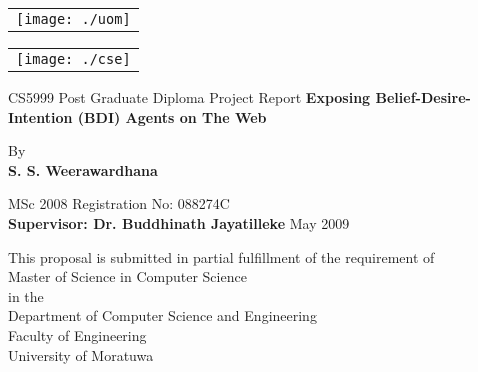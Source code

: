 \begin{titlepage}

\begin{minipage}{1in}
\begin{tabular}{l}
\texttt{[image: ./uom]}
\end{tabular}
\end{minipage}
\hfill
\begin{minipage}{1in}
\begin{tabular}{r}
\texttt{[image: ./cse]}
\end{tabular}
\end{minipage}


\begin{center}

\textmd{CS5999 Post Graduate Diploma Project Report}
\vfill
{ \huge \textbf{Exposing Belief-Desire-Intention (BDI) Agents on The Web} }\\[0.4cm]
\begin{center}
\vfill
By\\
\vfill
\large\textbf{S. S. Weerawardhana}
\end{center}

\begin{center}
\textmd{MSc 2008 Registration No: 088274C}\\
\vfill
\large\textbf{Supervisor: Dr. Buddhinath Jayatilleke}
\vfill
May 2009\\
\end{center}

\vfill
\begin{center}
This proposal is submitted in partial fulfillment of the requirement of\\
Master of Science in Computer Science\\
in the\\
Department of Computer Science and Engineering\\
Faculty of Engineering\\
University of Moratuwa\\
\end{center}
\vfill


\end{center}

\end{titlepage}